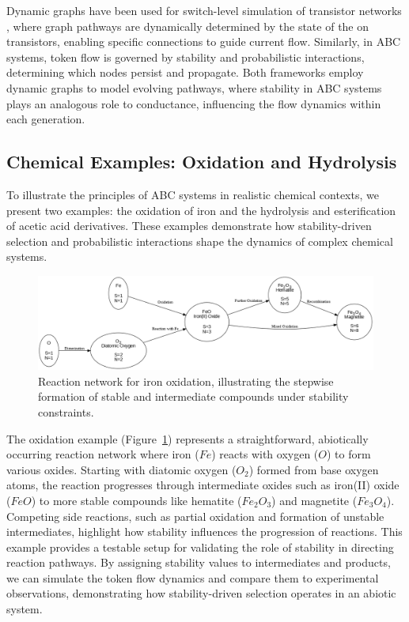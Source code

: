 \documentclass[entropy,article,submit,pdftex,oneauthor]{Definitions/mdpi}
\begin{document}
Dynamic graphs have been used for switch-level simulation of transistor networks \cite{AdlerCAD}, where graph pathways are dynamically determined by the state of the on transistors, enabling specific connections to guide current flow. Similarly, in ABC systems, token flow is governed by stability and probabilistic interactions, determining which nodes persist and propagate. Both frameworks employ dynamic graphs to model evolving pathways, where stability in ABC systems plays an analogous role to conductance, influencing the flow dynamics within each generation.

\subsection{Chemical Examples: Oxidation and Hydrolysis}

To illustrate the principles of ABC systems in realistic chemical contexts, we present two examples: the oxidation of iron and the hydrolysis and esterification of acetic acid derivatives. These examples demonstrate how stability-driven selection and probabilistic interactions shape the dynamics of complex chemical systems.

\begin{figure}[h]
    \centering
    \includegraphics[width=1\textwidth]{abc_oxi.png}
    \caption{Reaction network for iron oxidation, illustrating the stepwise formation of stable and intermediate compounds under stability constraints.}
    \label{fig:abc_oxi}
\end{figure}

The oxidation example (Figure~\ref{fig:abc_oxi}) represents a straightforward, abiotically occurring reaction network where iron (\(Fe\)) reacts with oxygen (\(O\)) to form various oxides. Starting with diatomic oxygen (\(O_2\)) formed from base oxygen atoms, the reaction progresses through intermediate oxides such as iron(II) oxide (\(FeO\)) to more stable compounds like hematite (\(Fe_2O_3\)) and magnetite (\(Fe_3O_4\)). Competing side reactions, such as partial oxidation and formation of unstable intermediates, highlight how stability influences the progression of reactions. This example provides a testable setup for validating the role of stability in directing reaction pathways. By assigning stability values to intermediates and products, we can simulate the token flow dynamics and compare them to experimental observations, demonstrating how stability-driven selection operates in an abiotic system.
\end{document}
